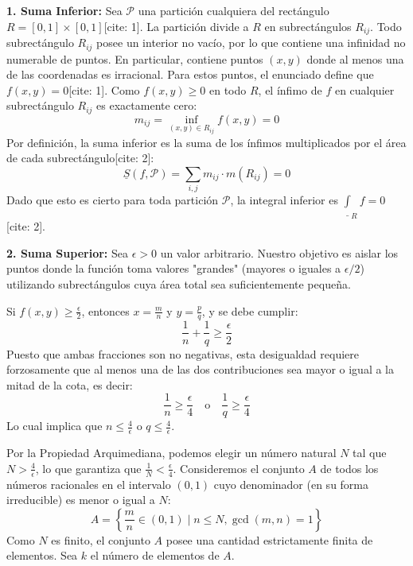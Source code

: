 \documentclass[11pt,letterpaper]{article}
\begin{document}
\textbf{1. Suma Inferior:}
Sea $\mathcal{P}$ una partición cualquiera del rectángulo $R=[0,1]\times[0,1]$[cite: 1]. La partición divide a $R$ en subrectángulos $R_{ij}$. Todo subrectángulo $R_{ij}$ posee un interior no vacío, por lo que contiene una infinidad no numerable de puntos. En particular, contiene puntos $(x,y)$ donde al menos una de las coordenadas es irracional. Para estos puntos, el enunciado define que $f(x,y) = 0$[cite: 1].
Como $f(x,y) \ge 0$ en todo $R$, el ínfimo de $f$ en cualquier subrectángulo $R_{ij}$ es exactamente cero:
\begin{equation*}
m_{ij} = \inf_{(x,y) \in R_{ij}} f(x,y) = 0
\end{equation*}
Por definición, la suma inferior es la suma de los ínfimos multiplicados por el área de cada subrectángulo[cite: 2]:
\begin{equation*}
\underline{S}(f, \mathcal{P}) = \sum_{i,j} m_{ij} \cdot m(R_{ij}) = 0
\end{equation*}
Dado que esto es cierto para toda partición $\mathcal{P}$, la integral inferior es $\underline{\int}_{R} f = 0$[cite: 2].

\textbf{2. Suma Superior:}
Sea $\epsilon > 0$ un valor arbitrario. Nuestro objetivo es aislar los puntos donde la función toma valores "grandes" (mayores o iguales a $\epsilon/2$) utilizando subrectángulos cuya área total sea suficientemente pequeña.

Si $f(x,y) \ge \frac{\epsilon}{2}$, entonces $x = \frac{m}{n}$ y $y = \frac{p}{q}$, y se debe cumplir:
\begin{equation*}
\frac{1}{n} + \frac{1}{q} \ge \frac{\epsilon}{2}
\end{equation*}
Puesto que ambas fracciones son no negativas, esta desigualdad requiere forzosamente que al menos una de las dos contribuciones sea mayor o igual a la mitad de la cota, es decir:
\begin{equation*}
\frac{1}{n} \ge \frac{\epsilon}{4} \quad \text{o} \quad \frac{1}{q} \ge \frac{\epsilon}{4}
\end{equation*}
Lo cual implica que $n \le \frac{4}{\epsilon}$ o $q \le \frac{4}{\epsilon}$. 

Por la Propiedad Arquimediana, podemos elegir un número natural $N$ tal que $N > \frac{4}{\epsilon}$, lo que garantiza que $\frac{1}{N} < \frac{\epsilon}{4}$.
Consideremos el conjunto $A$ de todos los números racionales en el intervalo $(0,1)$ cuyo denominador (en su forma irreducible) es menor o igual a $N$:
\begin{equation*}
A = \left\{ \frac{m}{n} \in (0,1) \mid n \le N, \gcd(m,n)=1 \right\}
\end{equation*}
Como $N$ es finito, el conjunto $A$ posee una cantidad estrictamente finita de elementos. Sea $k$ el número de elementos de $A$.
\end{document}
